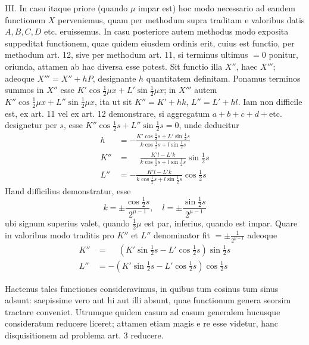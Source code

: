 III. In casu itaque priore (quando \(\mu\) impar est) hoc modo necessario ad eandem functionem \(X\) perveniemus, quam per methodum supra traditam e valoribus datis \(A,B,C,D\) etc. eruissemus. In casu posteriore autem methodus modo exposita suppeditat functionem, quae quidem eiusdem ordinis erit, cuius est functio, per methodum art. 12, sive per methodum art. 11, si terminus ultimus
\(=0\) ponitur, oriunda, attamen ab hac diversa esse potest. Sit functio illa \(X''\), haec \(X'''\); adeoque \(X'''=X''+hP\), designante \(h\) quantitatem definitam. Ponamus terminos summos in \(X''\) esse \(K'\cos\frac{1}{2}\mu x+L'\sin\frac{1}{2}\mu x\); in \(X'''\) autem \(K''\cos\frac{1}{2}\mu x+L''\sin\frac{1}{2}\mu x\), ita ut sit \(K''=K'+hk\), \(L''=L'+hl\). Iam non difficile est, ex art. 11 vel ex art. 12 demonstrare, si aggregatum \(a+b+c+d+\text{etc.}\) designetur per \(s\), esse \(K''\cos\frac{1}{2}s+L''\sin\frac{1}{2}s=0\), unde deducitur
\[
\begin{aligned}
h&=-\frac{K'\cos\frac{1}{2}s+L'\sin\frac{1}{2}s}
              {k\cos\frac{1}{2}s+l\sin\frac{1}{2}s}\\[5pt]
K''&=\phantom{-}\frac{K'l-L'k}
              {k\cos\frac{1}{2}s+l\sin\frac{1}{2}s}\sin\tfrac{1}{2}s\\[5pt]
L''&=-\frac{K'l-L'k}
              {k\cos\frac{1}{2}s+l\sin\frac{1}{2}s}\cos\tfrac{1}{2}s
\end{aligned}
\]
Haud difficilius demonstratur, esse
\[
k=\pm\frac{\cos\frac{1}{2}s}{2^{\mu-1}},\quad
l=\pm\frac{\sin\frac{1}{2}s}{2^{\mu-1}}
\]
ubi signum superius valet, quando \(\frac{1}{2}\mu\) est par, inferius, quando est impar. Quare in valoribus modo traditis pro \(K''\) et \(L''\) denominator fit \(=\pm\frac{1}{2^{\mu-1}}\) adeoque
\[
\begin{aligned}
K''&=\phantom{-}(K'\sin\tfrac{1}{2}s-L'\cos\tfrac{1}{2}s)\sin\tfrac{1}{2}s\\[5pt]
L''&=-(K'\sin\tfrac{1}{2}s-L'\cos\tfrac{1}{2}s)\cos\tfrac{1}{2}s
\end{aligned}
\]


Hactenus tales functiones consideravimus, in quibus tum cosinus tum sinus adsunt: saepissime vero aut hi aut illi absunt, quae functionum genera seorsim tractare conveniet. Utrumque quidem casum ad casum generalem hucusque consideratum reducere liceret; attamen etiam magis e re esse videtur, hanc disquisitionem ad problema art. 3 reducere.

